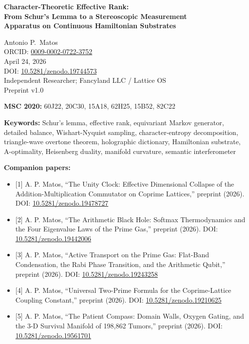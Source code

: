 \documentclass[
  11pt,
]{article}
\author{}
\date{}
\providecommand{\tightlist}{%
  \setlength{\itemsep}{0pt}\setlength{\parskip}{0pt}}
\begin{document}
\begin{center}
{\LARGE\bfseries Character-Theoretic Effective Rank:\\[0.4em]
From Schur's Lemma to a Stereoscopic Measurement\\[0.2em]
Apparatus on Continuous Hamiltonian Substrates}

\vspace{1.5em}

{\large Antonio P.\ Matos}\\[0.4em]
{\small ORCID: \href{https://orcid.org/0009-0002-0722-3752}{0009-0002-0722-3752}}\\[0.3em]
April 24, 2026\\[0.3em]
{\small DOI: \href{https://doi.org/10.5281/zenodo.19744573}{10.5281/zenodo.19744573}}\\[0.3em]
Independent Researcher; Fancyland LLC / Lattice OS\\[0.3em]
Preprint v1.0

\vspace{0.8em}

{\small\textbf{MSC 2020:} 60J22, 20C30, 15A18, 62H25, 15B52, 82C22}

\vspace{0.4em}

{\small\textbf{Keywords:} Schur's lemma, effective rank, equivariant Markov generator, detailed balance, Wishart-Nyquist sampling, character-entropy decomposition, triangle-wave overtone theorem, holographic dictionary, Hamiltonian substrate, A-optimality, Heisenberg duality, manifold curvature, semantic interferometer}
\end{center}

\textbf{Companion papers:}

\begin{itemize}
\tightlist
\item
  {[}1{]} A. P. Matos, ``The Unity Clock: Effective Dimensional Collapse
  of the Addition-Multiplication Commutator on Coprime Lattices,''
  preprint (2026). DOI:
  \href{https://doi.org/10.5281/zenodo.19478727}{10.5281/zenodo.19478727}
\item
  {[}2{]} A. P. Matos, ``The Arithmetic Black Hole: Softmax
  Thermodynamics and the Four Eigenvalue Laws of the Prime Gas,''
  preprint (2026). DOI:
  \href{https://doi.org/10.5281/zenodo.19442006}{10.5281/zenodo.19442006}
\item
  {[}3{]} A. P. Matos, ``Active Transport on the Prime Gas: Flat-Band
  Condensation, the Rabi Phase Transition, and the Arithmetic Qubit,''
  preprint (2026). DOI:
  \href{https://doi.org/10.5281/zenodo.19243258}{10.5281/zenodo.19243258}
\item
  {[}4{]} A. P. Matos, ``Universal Two-Prime Formula for the
  Coprime-Lattice Coupling Constant,'' preprint (2026). DOI:
  \href{https://doi.org/10.5281/zenodo.19210625}{10.5281/zenodo.19210625}
\item
  {[}5{]} A. P. Matos, ``The Patient Compass: Domain Walls, Oxygen
  Gating, and the 3-D Survival Manifold of 198,862 Tumors,'' preprint
  (2026). DOI:
  \href{https://doi.org/10.5281/zenodo.19561701}{10.5281/zenodo.19561701}
\end{itemize}
\end{document}
